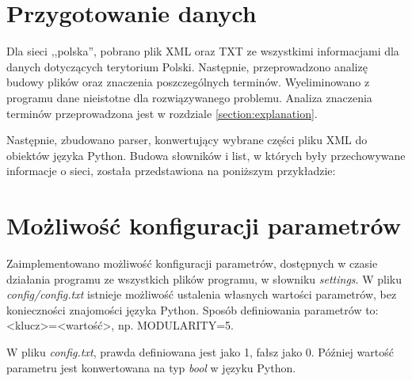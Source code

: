 \section{Przygotowanie danych}
\label{section:preparing}

Dla sieci ,,polska'', pobrano plik XML oraz TXT ze wszystkimi informacjami dla danych dotyczących terytorium Polski. Następnie, przeprowadzono analizę budowy plików oraz znaczenia poszczególnych terminów. Wyeliminowano z programu dane nieistotne dla rozwiązywanego problemu. Analiza znaczenia terminów przeprowadzona jest w rozdziale \ref{section:explanation}.

Następnie, zbudowano parser, konwertujący wybrane części pliku XML do obiektów języka Python. Budowa słowników i list, w których były przechowywane informacje o sieci, została przedstawiona na poniższym przykładzie:


\section{Możliwość konfiguracji parametrów}

Zaimplementowano możliwość konfiguracji parametrów, dostępnych w czasie działania programu ze wszystkich plików programu, w słowniku \textit{settings}. W pliku \textit{config/config.txt} istnieje możliwość ustalenia własnych wartości parametrów, bez konieczności znajomości języka Python. Sposób definiowania parametrów to: <klucz>=<wartość>, np. MODULARITY=5.

W pliku \textit{config.txt}, prawda definiowana jest jako 1, fałsz jako 0. Później wartość parametru jest konwertowana na typ \textit{bool} w języku Python.

